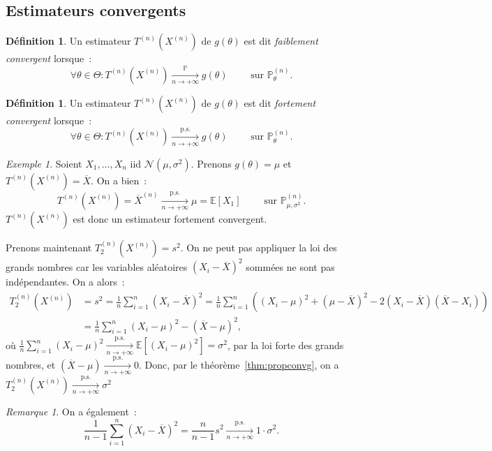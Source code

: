 \documentclass{report}
\renewcommand{\P}{\mathbb P}
\newcommand{\E}{\mathbb E}
\newcommand{\pinfty}{{+\infty}}
\newcommand{\cvgp}{\xrightarrow[n \to \pinfty]{\P}}
\newcommand{\ps}{{\text{p.s.}}}
\newcommand{\cvgps}{\xrightarrow[n \to \pinfty]\ps}
\newcommand{\Nms}{\mathcal N(\mu, \sigma^2)}
\theoremstyle{definition}
\newtheorem{déf}[thm]{Définition}
\theoremstyle{remark}
\newtheorem*{rmq}{Remarque}
\newtheorem{ex}{Exemple}[chapter]
\begin{document}
		\subsection{Estimateurs convergents}
			\begin{déf} Un estimateur $T^{(n)}(X^{(n)})$ de $g(\theta)$ est dit \textit{faiblement convergent} lorsque~:
			\[\forall \theta \in \Theta : T^{(n)}(X^{(n)}) \cvgp g(\theta) \qquad \text{ sur }\P_\theta^{(n)}.\]
			\end{déf}

			\begin{déf} Un estimateur $T^{(n)}(X^{(n)})$ de $g(\theta)$ est dit \textit{fortement convergent} lorsque~:
			\[\forall \theta \in \Theta : T^{(n)}(X^{(n)}) \cvgps g(\theta)\qquad \text{ sur }\P_\theta^{(n)}.\]
			\end{déf}

			\begin{ex} Soient $X_1, \ldots, X_n$ iid $\Nms$. Prenons $g(\theta) = \mu$ et $T^{(n)}(X^{(n)}) = \overline X$. On a bien~:
			\[T^{(n)}(X^{(n)}) = \overline X^{(n)} \cvgps \mu = \E[X_1] \qquad \text{ sur }\P_{\mu, \sigma^2}^{(n)}.\]
			$T^{(n)}(X^{(n)})$ est donc un estimateur fortement convergent.

			Prenons maintenant $T_2^{(n)}(X^{(n)}) = s^2$. On ne peut pas appliquer la loi des grands nombres car les variables aléatoires $(X_i - \overline X)^2$
			sommées ne sont pas indépendantes. On a alors~:
			\begin{align*}
				T_2^{(n)}(X^{(n)}) &= s^2 = \frac 1n\sum_{i=1}^n(X_i-\overline X)^2
					= \frac 1n\sum_{i=1}^n\left((X_i - \mu)^2 + (\mu - \overline X)^2 - 2(X_i - \overline X)(\overline X - X_i)\right) \\
				&= \frac 1n\sum_{i=1}^n(X_i - \mu)^2 - (\overline X - \mu)^2,
			\end{align*}
			où $\frac 1n\sum_{i=1}^n(X_i-\mu)^2 \cvgps \E\left[(X_i - \mu)^2\right] = \sigma^2$, par la loi forte des grands nombres,
			et $(\overline X - \mu) \cvgps 0$. Donc, par le théorème~\ref{thm:propconvg}, on a $T_2^{(n)}(X^{(n)}) \cvgps \sigma^2$
			\end{ex}

			\begin{rmq} On a également~:
			\[\frac 1{n-1}\sum_{i=1}^n(X_i-\overline X)^2 = \frac n{n-1}s^2 \cvgps 1 \cdot \sigma^2.\]
			\end{rmq}
\end{document}
